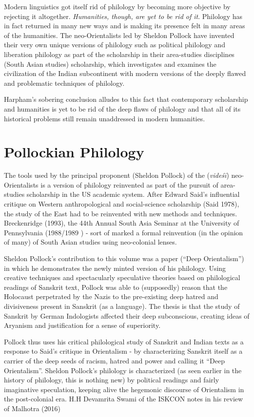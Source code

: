 Modern linguistics got itself rid of philology by becoming more objective by rejecting it altogether. \textit{Humanities, though, are yet to be rid of it}. Philology has in fact returned in many new ways and is making its presence felt in many areas of the humanities. The neo-Orientalists led by Sheldon Pollock have invented their very own unique versions of philology such as political philology and liberation philology as part of the scholarship in their area-studies disciplines (South Asian studies) scholarship, which investigates and examines the civilization of the Indian subcontinent with modern versions of the deeply flawed and problematic techniques of philology.

Harpham’s sobering conclusion alludes to this fact that contemporary scholarship and humanities is yet to be rid of the deep flaws of philology and that all of its historical problems still remain unaddressed in modern humanities.


\section*{Pollockian Philology}

The tools used by the principal proponent (Sheldon Pollock) of the (\textit{videśī}) neo-Orientalists is a version of philology reinvented as part of the pursuit of area-studies scholarship in the US academic system. After Edward Said’s influential critique on Western anthropological and social-science scholarship (Said 1978), the study of the East had to be reinvented with new methods and techniques. Breckenridge (1993), the 44th Annual South Asia Seminar at the University of Pennsylvania (1988/1989 ) - sort of marked a formal reinvention (in the opinion of many) of South Asian studies using neo-colonial lenses.

\newpage

Sheldon Pollock’s contribution to this volume was a paper (“Deep Orientalism”) in which he demonstrates the newly minted version of his philology. Using creative techniques and spectacularly speculative theories based on philological readings of Sanskrit text, Pollock was able to (supposedly) reason that the Holocaust perpetrated by the Nazis to the pre-existing deep hatred and divisiveness present in Sanskrit (as a language). The thesis is that the study of Sanskrit by German Indologists affected their deep subconscious, creating ideas of Aryanism and justification for a sense of superiority.

Pollock thus uses his critical philological study of Sanskrit and Indian texts as a response to Said’s critique in Orientalism - by characterizing Sanskrit itself as a carrier of the deep seeds of racism, hatred and power and calling it “Deep Orientalism”. Sheldon Pollock’s philology is characterized (as seen earlier in the history of philology, this is nothing new) by political readings and fairly imaginative speculation, keeping alive the hegemonic discourse of Orientalism in the post-colonial era. H.H Devamrita Swami of the ISKCON notes in his review of Malhotra (2016)

